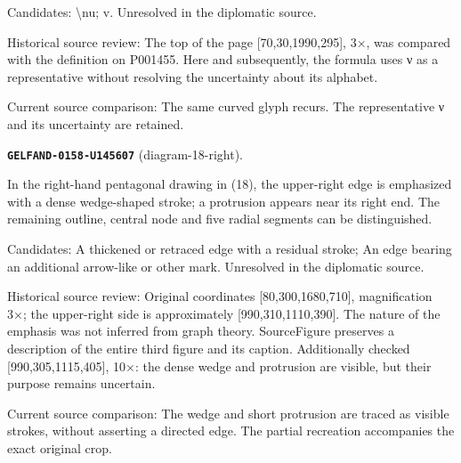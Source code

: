 Candidates: \textbackslash{}nu; v. Unresolved in the diplomatic source.\par
Historical source review: The top of the page [70,30,1990,295], 3×, was compared with the definition on P001455. Here and subsequently, the formula uses ν as a representative without resolving the uncertainty about its alphabet.\par
Current source comparison: The same curved glyph recurs. The representative ν and its uncertainty are retained.\par\medskip
\par\noindent\leavevmode{}\label{GELFAND-0158-U145607}\label{GELFAND-P001456:diagram-18-right}\textbf{\texttt{GELFAND-0158-U145607}} (diagram-18-right).\nopagebreak[4]\par
In the right-hand pentagonal drawing in (18), the upper-right edge is emphasized with a dense wedge-shaped stroke; a protrusion appears near its right end. The remaining outline, central node and five radial segments can be distinguished.\par
Candidates: A thickened or retraced edge with a residual stroke; An edge bearing an additional arrow-like or other mark. Unresolved in the diplomatic source.\par
Historical source review: Original coordinates [80,300,1680,710], magnification 3×; the upper-right side is approximately [990,310,1110,390]. The nature of the emphasis was not inferred from graph theory. SourceFigure preserves a description of the entire third figure and its caption. Additionally checked [990,305,1115,405], 10×: the dense wedge and protrusion are visible, but their purpose remains uncertain.\par
Current source comparison: The wedge and short protrusion are traced as visible strokes, without asserting a directed edge. The partial recreation accompanies the exact original crop.\par\medskip
